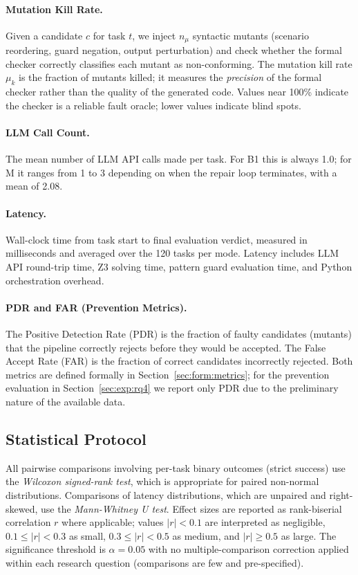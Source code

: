 \paragraph{Mutation Kill Rate.}
Given a candidate $c$ for task $t$, we inject $n_\mu$ syntactic mutants (scenario
reordering, guard negation, output perturbation) and check whether the formal
checker correctly classifies each mutant as non-conforming.  The mutation kill rate
$\mu_k$ is the fraction of mutants killed; it measures the \emph{precision} of the
formal checker rather than the quality of the generated code.  Values near 100\%
indicate the checker is a reliable fault oracle; lower values indicate blind spots.

\paragraph{LLM Call Count.}
The mean number of LLM API calls made per task.  For B1 this is always 1.0; for
M it ranges from 1 to 3 depending on when the repair loop terminates, with a mean
of 2.08.

\paragraph{Latency.}
Wall-clock time from task start to final evaluation verdict, measured in milliseconds
and averaged over the 120 tasks per mode.  Latency includes LLM API round-trip time,
Z3 solving time, pattern guard evaluation time, and Python orchestration overhead.

\paragraph{PDR and FAR (Prevention Metrics).}
The Positive Detection Rate (PDR) is the fraction of faulty candidates (mutants) that
the pipeline correctly rejects before they would be accepted.  The False Accept Rate
(FAR) is the fraction of correct candidates incorrectly rejected.  Both metrics are
defined formally in Section~\ref{sec:form:metrics}; for the prevention evaluation in
Section~\ref{sec:exp:rq4} we report only PDR due to the preliminary nature of the
available data.

\subsection{Statistical Protocol}

All pairwise comparisons involving per-task binary outcomes (strict success) use the
\emph{Wilcoxon signed-rank test}, which is appropriate for paired non-normal
distributions.  Comparisons of latency distributions, which are unpaired and
right-skewed, use the \emph{Mann-Whitney U test}.  Effect sizes are reported as
rank-biserial correlation $r$ where applicable; values $|r| < 0.1$ are interpreted
as negligible, $0.1 \le |r| < 0.3$ as small, $0.3 \le |r| < 0.5$ as medium, and
$|r| \ge 0.5$ as large.  The significance threshold is $\alpha = 0.05$ with no
multiple-comparison correction applied within each research question (comparisons are
few and pre-specified).

